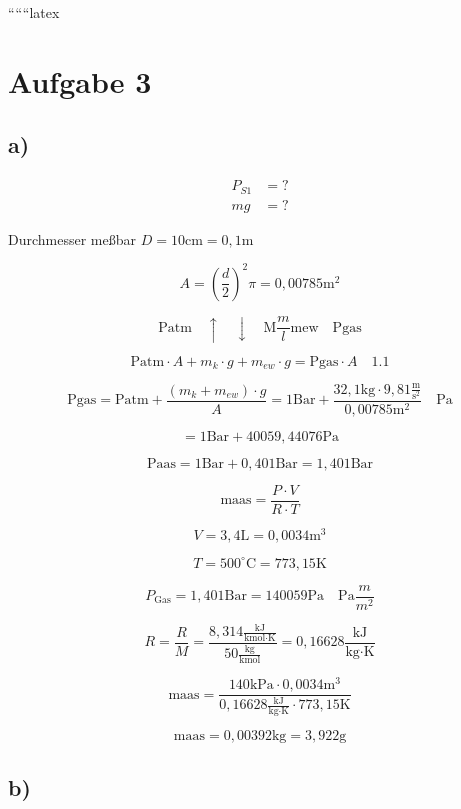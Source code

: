 
``````latex


\section*{Aufgabe 3}

\subsection*{a)}

\begin{align*}
P_{S1} &= ? \\
mg &= ?
\end{align*}

Durchmesser meßbar \( D = 10 \text{cm} = 0{,}1 \text{m} \)

\[
A = \left( \frac{d}{2} \right)^2 \pi = 0{,}00785 \text{m}^2
\]

\[
\text{Patm} \quad \uparrow \quad \downarrow \quad \text{M} \frac{m}{l} \text{mew} \quad \text{Pgas}
\]

\[
\text{Patm} \cdot A + m_k \cdot g + m_{ew} \cdot g = \text{Pgas} \cdot A \quad \text{1.1}
\]

\[
\text{Pgas} = \text{Patm} + \frac{(m_k + m_{ew}) \cdot g}{A} = 1 \text{Bar} + \frac{32{,}1 \text{kg} \cdot 9{,}81 \frac{\text{m}}{\text{s}^2}}{0{,}00785 \text{m}^2} \quad \text{Pa}
\]

\[
= 1 \text{Bar} + 40 059{,}44076 \text{Pa}
\]

\[
\text{Paas} = 1 \text{Bar} + 0{,}401 \text{Bar} = 1{,}401 \text{Bar}
\]

\[
\text{maas} = \frac{P \cdot V}{R \cdot T}
\]

\[
V = 3{,}4 \text{L} = 0{,}0034 \text{m}^3
\]

\[
T = 500^\circ \text{C} = 773{,}15 \text{K}
\]

\[
P_{\text{Gas}} = 1{,}401 \text{Bar} = 140 059 \text{Pa} \quad \text{Pa} \frac{m}{m^2}
\]

\[
R = \frac{R}{M} = \frac{8{,}314 \frac{\text{kJ}}{\text{kmol} \cdot \text{K}}}{50 \frac{\text{kg}}{\text{kmol}}} = 0{,}16628 \frac{\text{kJ}}{\text{kg} \cdot \text{K}}
\]

\[
\text{maas} = \frac{140 \text{kPa} \cdot 0{,}0034 \text{m}^3}{0{,}16628 \frac{\text{kJ}}{\text{kg} \cdot \text{K}} \cdot 773{,}15 \text{K}}
\]

\[
\text{maas} = 0{,}00392 \text{kg} = 3{,}922 \text{g}
\]

\subsection*{b)}

